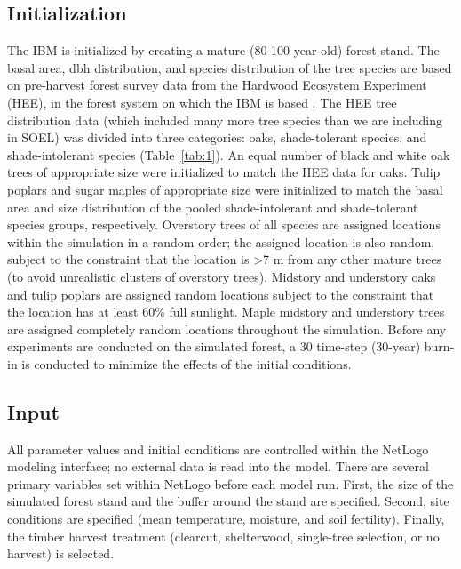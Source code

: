 \documentclass[
11pt, %
a4paper, %
oneside, %
headinclude,footinclude, %
]{scrartcl}
\begin{document}
\subsection{Initialization}
\label{initialization}

The IBM is initialized by creating a mature (80-100 year old) forest stand. The basal area, dbh distribution, and species distribution of the tree species are based on pre-harvest forest survey data from the Hardwood Ecosystem Experiment (HEE), in the forest system on which the IBM is based \citep{Saunders2013}. The HEE tree distribution data (which included many more tree species than we are including in SOEL) was divided into three categories: oaks, shade-tolerant species, and shade-intolerant species (Table~\ref{tab:1}). An equal number of black and white oak trees of appropriate size were initialized to match the HEE data for oaks. Tulip poplars and sugar maples of appropriate size were initialized to match the basal area and size distribution of the pooled shade-intolerant and shade-tolerant species groups, respectively. Overstory trees of all species are assigned locations within the simulation in a random order; the assigned location is also random, subject to the constraint that the location is \textgreater 7 m from any other mature trees (to avoid unrealistic clusters of overstory trees). Midstory and understory oaks and tulip poplars are assigned random locations subject to the constraint that the location has at least 60\% full sunlight. Maple midstory and understory trees are assigned completely random locations throughout the simulation. Before any experiments are conducted on the simulated forest, a 30 time-step (30-year) burn-in is conducted to minimize the effects of the initial conditions. 



\subsection{Input}

All parameter values and initial conditions are controlled within the NetLogo modeling interface; no external data is read into the model. There are several primary variables set within NetLogo before each model run. First, the size of the simulated forest stand and the buffer around the stand are specified. Second, site conditions are specified (mean temperature, moisture, and soil fertility). Finally, the timber harvest treatment (clearcut, shelterwood, single-tree selection, or no harvest) is selected.
\end{document}
